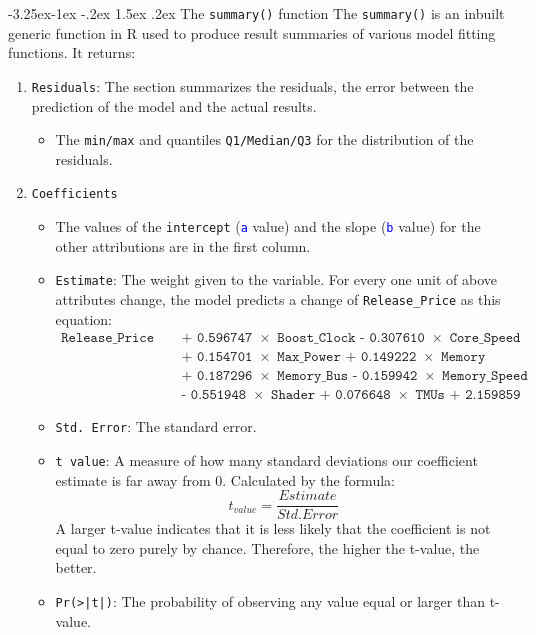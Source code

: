 \documentclass[a4paper]{article}
\makeatletter
\newcounter {subsubsubsection}[subsubsection]
\newcommand\subsubsubsection{\@startsection{subsubsubsection}{4}{\z@}%
                                     {-3.25ex\@plus -1ex \@minus -.2ex}%
                                     {1.5ex \@plus .2ex}%
                                     {\normalfont\normalsize\bfseries}}
\makeatother
\begin{document}
\subsubsubsection{The \texttt{summary()} function} 
The \texttt{summary()} is an inbuilt generic function in R used to produce result summaries of various model fitting functions. It returns:
\begin{enumerate}
    \item \verb|Residuals|: The section summarizes the residuals, the error between the prediction of the model and the actual results. 
    \begin{itemize}
        \item The \verb|min/max| and quantiles \verb|Q1/Median/Q3| for the distribution of the residuals.
    \end{itemize}
    
    \item \verb|Coefficients|
    \begin{itemize}
        \item The values of the \verb|intercept| (\textcolor{blue}{\texttt{a}} value) and the slope (\textcolor{blue}{\texttt{b}} value) for the other attributions are in the first column.
        \item \verb|Estimate|:  The weight given to the variable. For every one unit of above attributes change, the model predicts a change of \verb|Release_Price| as this equation:
        \begin{align*}
            \texttt{Release\_Price =} &\texttt{ + 0.596747 $\times$ Boost\_Clock - 0.307610 $\times$ Core\_Speed}\\ 
            &\texttt{ + 0.154701 $\times$ Max\_Power + 0.149222 $\times$ Memory}\\
            &\texttt{ + 0.187296 $\times$ Memory\_Bus - 0.159942 $\times$ Memory\_Speed}\\
            &\texttt{ - 0.551948 $\times$ Shader + 0.076648 $\times$ TMUs + 2.159859}
        \end{align*}
        
        \item \verb|Std. Error|: The standard error.
        \item \verb|t value|:  A measure of how many standard deviations our coefficient estimate is far away from 0. Calculated by the formula:
        \begin{equation*}
            t_{value} = \dfrac{Estimate}{Std. Error}
        \end{equation*}
         A larger t-value indicates that it is less likely that the coefficient is not equal to zero purely by chance. Therefore, the higher the t-value, the better.
         \item \texttt{Pr(>|t|)}: The probability of observing any value equal or larger than t-value.
    \end{itemize}
    

\end{enumerate}
\end{document}
